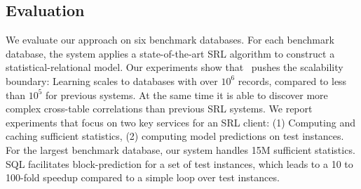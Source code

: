 %

\subsection{Evaluation} We evaluate our approach on six benchmark databases. For each benchmark database, the system applies a state-of-the-art SRL algorithm to construct a statistical-relational model.
Our experiments show that \FB\ pushes the scalability boundary: Learning scales to databases with over $10^6$ records, compared to less than $10^5$ for previous systems. At the same time it is able to discover more complex cross-table correlations than previous SRL systems. We report experiments that focus on two key services for an SRL client: (1) Computing and caching sufficient statistics, (2) computing model predictions on test instances. For the largest benchmark database, our system handles 15M sufficient statistics. 
SQL facilitates block-prediction for a set of test instances, which leads to a 10 to 100-fold speedup compared to a simple loop over test instances.


